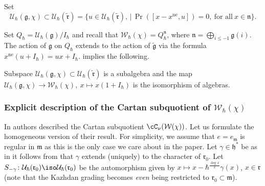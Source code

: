 \documentclass[12pt]{amsart}
\begin{document}
Set 
\begin{equation*}
\mathcal{U}_{\hbar}(\mathfrak{g},\chi) \subset \mathcal{U}_\hbar(\widetilde{\mathfrak{r}}) = \{u \in \mathcal{U}_\hbar(\widetilde{\mathfrak{r}}),\,|\, \operatorname{Pr}([x-x^{\mathrm{ne}},u])=0,~\text{for all}~x \in \mathfrak{n}\}.
\end{equation*}


Set $Q_\hbar=\mathcal{U}_\hbar(\mathfrak{g})/I_\hbar$ and recall that $\mathcal{W}_\hbar(\chi)=Q_\hbar^{\mathfrak{n}}$, where $\mathfrak{n}=\bigoplus_{i \leqslant -1}\mathfrak{g}(i)$. The action of $\mathfrak{g}$ on $Q_\hbar$ extends to the action of $\widetilde{\mathfrak{g}}$ via the formula $x^{\mathrm{ne}}(u+I_\hbar)=ux+I_\hbar$. \cite[Theorem 2.4]{BGK} implies the following.

\begin{prop}\label{alter_def_W}
Subspace $\mathcal{U}_\hbar(\mathfrak{g},\chi) \subset \mathcal{U}_\hbar(\widetilde{\mathfrak{r}})$ is a subalgebra and the map 
$
\mathcal{U}_\hbar(\mathfrak{g},\chi) \rightarrow \mathcal{W}_\hbar(\chi),~x \mapsto x(1+I_\hbar)
$
is the isomorphism of algebras. 
\end{prop}



\subsubsection{Explicit description of the Cartan subquotient of $\mathcal{W}_{\hbar}(\chi)$}
 In \cite{BGK} authors described the Cartan subquotient $\cC_\nu(\mathcal{W}(\chi))$. Let us formulate the homogeneous version of their result. For simplicity, we assume that $e=e_{\mathfrak{m}}$ is regular in $\mathfrak{m}$ as this is the only case we care about in the paper.
 Let $\gamma \in \mathfrak{h}^*$ be as in \cite[Section 4.1]{BGK} it follows from \cite[Lemma 4.1]{BGK} that $\gamma$ extends (uniquely) to the character of $\mathfrak{r}_0$. Let $S_{-\gamma}\colon \mathcal{U}_\hbar(\mathfrak{r}_0) \iso \mathcal{U}_\hbar(\mathfrak{r}_0)$ be the automorphism given by $x \mapsto x-\hbar^{\frac{\operatorname{deg}x}{2}}\gamma(x)$, $x \in \mathfrak{r}$ (note that the Kazhdan grading becomes {\emph{even}} being restricted to $\mathfrak{r}_0 \subset \mathfrak{m}$).
\end{document}
